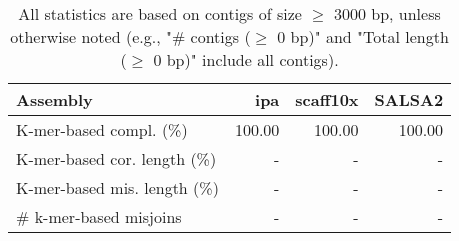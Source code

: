 \documentclass[12pt,a4paper]{article}
\begin{document}
\begin{table}[ht]
\begin{center}
\caption{All statistics are based on contigs of size $\geq$ 3000 bp, unless otherwise noted (e.g., "\# contigs ($\geq$ 0 bp)" and "Total length ($\geq$ 0 bp)" include all contigs).}
\begin{tabular}{|l*{3}{|r}|}
\hline
Assembly & ipa & scaff10x & SALSA2 \\ \hline
K-mer-based compl. (\%) & 100.00 & 100.00 & 100.00 \\ \hline
K-mer-based cor. length (\%) & - & - & - \\ \hline
K-mer-based mis. length (\%) & - & - & - \\ \hline
\# k-mer-based misjoins & - & - & - \\ \hline
\end{tabular}
\end{center}
\end{table}
\end{document}
